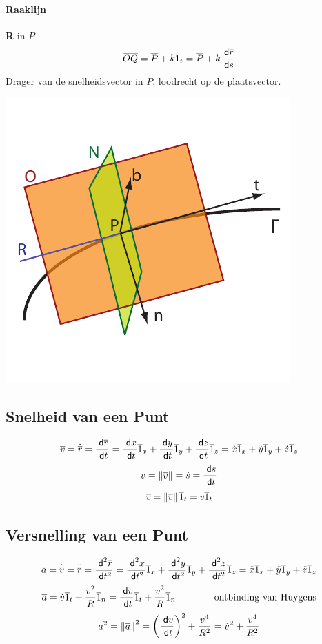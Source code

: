 \paragraph{Raaklijn} \textbf{R} in $P$
\label{sec:Raakvlak}
\[
  \overline{OQ} = \overline{P} + k\overline{1}_t = \overline{P} + k\frac{\;\textsf{d}\overline{r}}{\;\textsf{d}s}
\]
Drager van de snelheidsvector in $P$, loodrecht op de plaatsvector.

\includegraphics{Figuren/Vlakken.pdf}


\subsection{Snelheid van een Punt}
\label{sec:SnelheidPunt}
\[
  \overline{v} = \dot{\overline{r}}
          = \frac{\;\textsf{d}\overline{r}}{\;\textsf{d}t}
          = \frac{\;\textsf{d}x}{\;\textsf{d}t} \overline{1}_x + \frac{\;\textsf{d}y}{\;\textsf{d}t} \overline{1}_y + \frac{\;\textsf{d}z}{\;\textsf{d}t} \overline{1}_z
          = \dot{x} \overline{1}_x + \dot{y} \overline{1}_y + \dot{z} \overline{1}_z
\]
\[
  v       = \left\| \overline{v} \right\|
          = \dot{s}
          = \frac{\;\textsf{d}s}{\;\textsf{d}t}
\]
\[
  \overline{v} = \left\| \overline{v} \right\| \overline{1}_t
          = v \overline{1}_t
\]
\subsection{Versnelling van een Punt}
\label{sec:VersnellingPunt}
\[
  \overline{a} = \dot{\overline{v}}
          = \ddot{\overline{r}}
          = \frac{\;\textsf{d}^2 \overline{r}}{\;\textsf{d}t^2}
          = \frac{\;\textsf{d}^2{x}}{\;\textsf{d}t^2} \overline{1}_x + \frac{\;\textsf{d}^2{y}}{\;\textsf{d}t^2} \overline{1}_y + \frac{\;\textsf{d}^2{z}}{\;\textsf{d}t^2} \overline{1}_z
          = \ddot{x} \overline{1}_x + \ddot{y} \overline{1}_y + \ddot{z} \overline{1}_z
\]
\[
  \overline{a} = \dot{v} \overline{1}_t + \frac{v^2}{R} \overline{1}_n
          = \frac{\;\textsf{d}v}{\;\textsf{d}t} \overline{1}_t + \frac{v^2}{R} \overline{1}_n
          \qquad \qquad \mbox{ontbinding van Huygens}
\]
\[
  a^2    = \left\| \overline{a} \right\|^2
         = \left( \frac{\;\textsf{d}v}{\;\textsf{d}t} \right)^2 + \frac{v^4}{R^2}
         = \dot{v}^2 + \frac{v^4}{R^2}
\]

